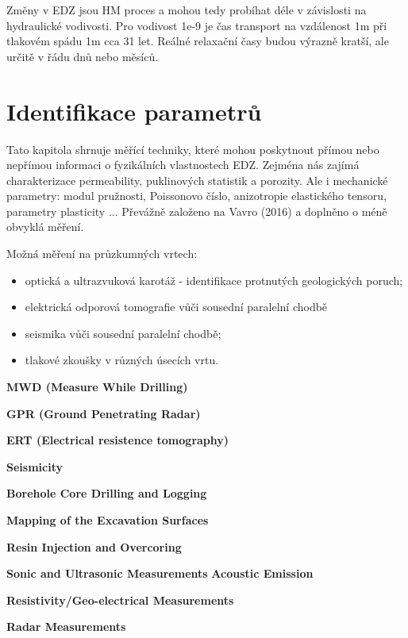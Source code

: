 \documentclass{article}
\begin{document}
Změny v EDZ jsou HM proces a mohou tedy probíhat déle v závislosti na hydraulické vodivosti. Pro vodivost 1e-9 je čas transport na vzdálenost 1m při tlakovém spádu 1m cca 31 let. Reálné relaxační časy budou výrazně kratší, ale určitě v řádu dnů nebo měsíců. 

\section{Identifikace parametrů}
\label{sec:parameters}

Tato kapitola shrnuje měřící techniky, které mohou poskytnout přímou nebo nepřímou informaci 
o fyzikálních vlastnostech EDZ. Zejména nás zajímá charakterizace permeability, puklinových statistik a porozity. Ale i mechanické parametry: modul pružnosti, Poissonovo číslo, anizotropie elastického tensoru,  parametry plasticity ...
Převážně založeno na Vavro (2016) \cite{Vavro2016} a doplněno o méně obvyklá měření.


Možná měření na průzkumných vrtech:
    \begin{itemize}
        \item optická a ultrazvuková karotáž - identifikace protnutých geologických poruch;
        \item elektrická odporová tomografie vůči sousední paralelní chodbě
        \item seismika vůči sousední paralelní chodbě;
        \item tlakové zkoušky v různých úsecích vrtu.
    \end{itemize}

{\bf MWD (Measure While Drilling)} \cite{JeroenvanEldert2018}

{\bf GPR (Ground Penetrating Radar)} 

{\bf ERT (Electrical resistence tomography)}


{\bf Seismicity}

{\bf  Borehole Core Drilling and Logging} \cite{Lanyon2011}

{\bf Mapping of the Excavation Surfaces} \cite{Lanyon2011}

{\bf  Resin Injection and Overcoring} \cite{Lanyon2011}

{\bf  Sonic and Ultrasonic Measurements} \cite{Lanyon2011}
{\bf  Acoustic Emission} \cite{Lanyon2011}

{\bf  Resistivity/Geo-electrical Measurements} \cite{Lanyon2011}

{\bf  Radar Measurements} \cite{Lanyon2011}
\end{document}
